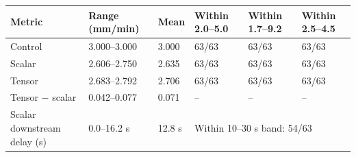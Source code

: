 \begin{tabular}{@{}llllll@{}}
\toprule
Metric & Range (mm/min) & Mean & Within 2.0--5.0 & Within 1.7--9.2 & Within 2.5--4.5 \\
\midrule
Control & 3.000--3.000 & 3.000 & 63/63 & 63/63 & 63/63 \\
Scalar & 2.606--2.750 & 2.635 & 63/63 & 63/63 & 63/63 \\
Tensor & 2.683--2.792 & 2.706 & 63/63 & 63/63 & 63/63 \\
Tensor − scalar & 0.042--0.077 & 0.071 & -- & -- & -- \\
\midrule
Scalar downstream delay (s) & 0.0--16.2 s & 12.8 s & \multicolumn{3}{l}{Within 10--30 s band: 54/63} \\
\bottomrule
\end{tabular}

